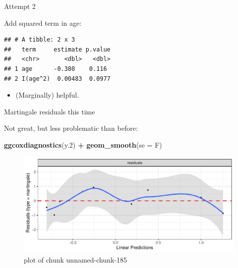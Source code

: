 \documentclass[ignorenonframetext,]{beamer}
\newenvironment{Shaded}{\begin{snugshade}}{\end{snugshade}}
\newcommand{\DataTypeTok}[1]{\textcolor[rgb]{0.13,0.29,0.53}{#1}}
\newcommand{\DecValTok}[1]{\textcolor[rgb]{0.00,0.00,0.81}{#1}}
\newcommand{\FloatTok}[1]{\textcolor[rgb]{0.00,0.00,0.81}{#1}}
\newcommand{\KeywordTok}[1]{\textcolor[rgb]{0.13,0.29,0.53}{\textbf{#1}}}
\newcommand{\NormalTok}[1]{#1}
\newcommand{\OperatorTok}[1]{\textcolor[rgb]{0.81,0.36,0.00}{\textbf{#1}}}
\newcommand{\StringTok}[1]{\textcolor[rgb]{0.31,0.60,0.02}{#1}}
\providecommand{\tightlist}{%
  \setlength{\itemsep}{0pt}\setlength{\parskip}{0pt}}
\begin{document}
\begin{frame}[fragile]{Attempt 2}
\protect\hypertarget{attempt-2}{}

Add squared term in age:

\begin{Shaded}
\end{Shaded}

\begin{verbatim}
## # A tibble: 2 x 3
##   term     estimate p.value
##   <chr>       <dbl>   <dbl>
## 1 age      -0.380    0.116 
## 2 I(age^2)  0.00483  0.0977
\end{verbatim}

\begin{itemize}
\tightlist
\item
  (Marginally) helpful.
\end{itemize}

\end{frame}

\begin{frame}[fragile]{Martingale residuals this time}
\protect\hypertarget{martingale-residuals-this-time}{}

Not great, but less problematic than before:

\begin{Shaded}
\begin{Highlighting}[]
\KeywordTok{ggcoxdiagnostics}\NormalTok{(y}\FloatTok{.2}\NormalTok{) }\OperatorTok{+}\StringTok{ }\KeywordTok{geom_smooth}\NormalTok{(}\DataTypeTok{se =}\NormalTok{ F)}
\end{Highlighting}
\end{Shaded}

\begin{figure}
\centering
\includegraphics{figure/unnamed-chunk-185-1.pdf}
\caption{plot of chunk unnamed-chunk-185}
\end{figure}

\end{frame}
\end{document}
